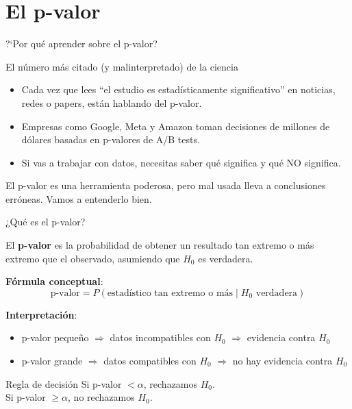 \documentclass[aspectratio=169, 11pt]{beamer}
\begin{document}
\section{El p-valor}

\begin{frame}{?`Por qu\'e aprender sobre el p-valor?}
\small
\begin{exampleblock}{El n\'umero m\'as citado (y malinterpretado) de la ciencia}
\begin{itemize}\setlength{\itemsep}{2pt}
  \item Cada vez que lees ``el estudio es estad\'isticamente significativo'' en noticias, redes o papers, est\'an hablando del p-valor.
  \item Empresas como Google, Meta y Amazon toman decisiones de millones de d\'olares basadas en p-valores de A/B tests.
  \item Si vas a trabajar con datos, \alert{necesitas} saber qu\'e significa y qu\'e NO significa.
\end{itemize}
\end{exampleblock}

\vspace{0.2cm}
El p-valor es una herramienta poderosa, pero mal usada lleva a conclusiones err\'oneas. Vamos a entenderlo bien.
\end{frame}

\begin{frame}{¿Qué es el p-valor?}
\begin{definition}[p-valor]
El \textbf{p-valor} es la probabilidad de obtener un resultado tan extremo o más extremo que el observado, \alert{asumiendo que $H_0$ es verdadera}.
\end{definition}

\vspace{0.2cm}
\textbf{Fórmula conceptual}:
\[
\text{p-valor} = P(\text{estadístico tan extremo o más} \mid H_0 \text{ verdadera})
\]

\textbf{Interpretación}:
\begin{itemize}
  \item p-valor \alert{pequeño} $\Rightarrow$ datos incompatibles con $H_0$ $\Rightarrow$ evidencia contra $H_0$
  \item p-valor \alert{grande} $\Rightarrow$ datos compatibles con $H_0$ $\Rightarrow$ no hay evidencia contra $H_0$
\end{itemize}

\begin{block}{Regla de decisión}
Si p-valor $< \alpha$, rechazamos $H_0$.\\
Si p-valor $\geq \alpha$, no rechazamos $H_0$.
\end{block}
\end{frame}
\end{document}
